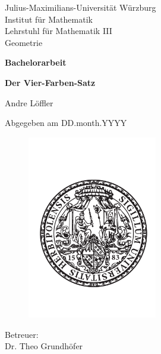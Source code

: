 \begin{titlepage}
  Julius-Maximilians-Universität Würzburg\\
  Institut für Mathematik\\
  Lehrstuhl für Mathematik III\\
  Geometrie
  
  \vspace{2cm}
  
  \begin{center}
   \LARGE\textbf{Bachelorarbeit}
  \end{center}
  
  \vspace{0cm}
  
  \begin{center}
   \huge\textbf{Der Vier-Farben-Satz}
  \end{center}
  
  \vspace{1cm}
  
  \begin{center}
   \Large Andre Löffler
  \end{center}
  
  \vspace{0cm}
  
  \begin{center}
   \Large Abgegeben am DD.month.YYYY
  \end{center}
  
  \begin{figure}[ht]
    \begin{center}
      \includegraphics[height=8cm]{siegel.pdf}  
    \end{center}
  \end{figure}
  
  \begin{center}
   \Large Betreuer:\\Dr. Theo Grundhöfer
  \end{center}
\end{titlepage}